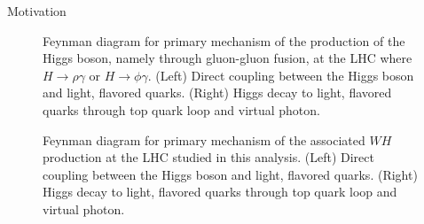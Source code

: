 \begin{section}{Motivation}
\begin{figure}[htb]
\begin{center}
\subfloat      {
\scalebox{.45}[0.45]{}
}\quad
\subfloat      {
\scalebox{.45}[0.45]{}
}
\end{center}
\caption{Feynman diagram\cite{cite-tikz-feynman} for primary mechanism of the production of the Higgs boson, namely through gluon-gluon fusion, at the LHC where $H \rightarrow \rho\gamma$ or $H \rightarrow \phi\gamma$. (Left) Direct coupling between the Higgs boson and light, flavored quarks. (Right) Higgs decay to light, flavored quarks through top quark loop and virtual photon.}
\label{fig:direct-prod}
\end{figure}

\begin{figure}[htb]
\begin{center}
\subfloat      {
\scalebox{.55}[0.55]{}
}\quad
\subfloat      {
\scalebox{.55}[0.55]{}
}
\end{center}
\caption{Feynman diagram\cite{cite-tikz-feynman} for primary mechanism of the associated $WH$ production at the LHC studied in this analysis. (Left) Direct coupling between the Higgs boson and light, flavored quarks. (Right) Higgs decay to light, flavored quarks through top quark loop and virtual photon.}
\label{fig:whiggs-prod}
\end{figure}

\end{section}

